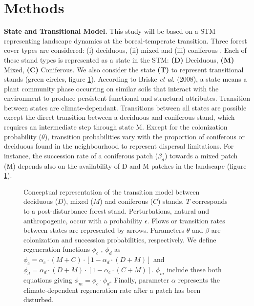 \section{Methods}

\textbf{State and Transitional Model.} This study will be based on a STM
representing landscape dynamics at the boreal-temperate transition. Three
forest cover types are considered: (i) deciduous, (ii) mixed and (iii)
coniferous \cite{Fisichelli2013}.  Each of these stand types is represented as
a state in the STM: \textbf{(D)} Deciduous, \textbf{(M)} Mixed, \textbf{(C)}
Coniferous. We also consider the state \textbf{(T)} to represent transitional
stands (green circles, figure \ref{Model}).  According to Briske\textit{ et
al.} (2008), a state means a plant community phase occurring on similar soils
that interact with the environment to produce persistent functional and
structural attributes. Transition between states are climate-dependant.
Transitions between all states are possible except the direct transition
between a deciduous and coniferous stand, which requires an intermediate step
through state M. Except for the colonization probability ($\theta$),
transition probabilities vary with the proportion of coniferous or deciduous
found in the  neighbourhood to represent dispersal limitations. For instance,
the succession rate of a coniferous patch ($\beta_d$) towards a mixed patch
(M) depends also on the availability of D and M patches in the landscape
(figure \ref{Model}).  \\


\begin{figure}
	\vspace{-2em}
	
	\caption{Conceptual representation of the transition model between deciduous ($D$),
	mixed ($M$) and coniferous ($C$) stands. $T$ corresponds to a post-disturbance forest stand. Perturbations, natural and anthropogenic, occur with a probability $\epsilon$.
	Flows or transition rates between states are represented by arrows.
	Parameters $\theta$ and $\beta$ are  colonization and succession probabilities,
	respectively. We define regeneration functions $\phi_c$ , $\phi_d$ as $\phi_c
	= \alpha_c \cdot (M+C) \cdot [1- \alpha_d \cdot (D+M)]$ and $\phi_d =
	\alpha_d \cdot (D+M) \cdot [1- \alpha_c \cdot (C+M)]$. $\phi_m$ include these both equations giving $\phi_m = \phi_c \cdot \phi_d$. Finally, parameter $\alpha$ represents the climate-dependent regeneration rate after a patch has been disturbed.}
	\label{Model}
	\vspace{1.5em}
\end{figure}

